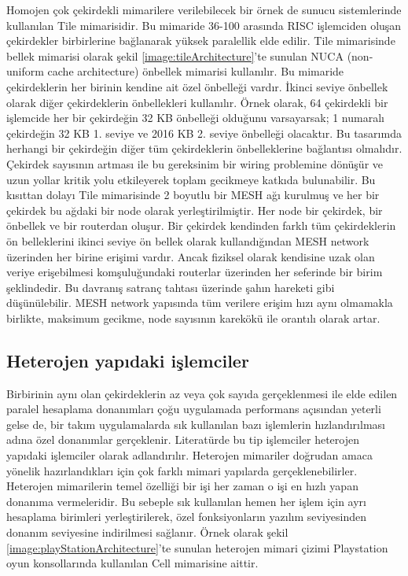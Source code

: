 Homojen çok çekirdekli mimarilere verilebilecek bir örnek de sunucu sistemlerinde kullanılan Tile mimarisidir. \cite{tileArchitecture} Bu mimaride 36-100 arasında RISC işlemciden oluşan çekirdekler birbirlerine bağlanarak yüksek paralellik elde edilir. Tile mimarisinde bellek mimarisi olarak şekil  \ref{image:tileArchitecture}'te sunulan NUCA (non-uniform cache architecture) önbellek mimarisi kullanılır. Bu mimaride çekirdeklerin her birinin kendine ait özel önbelleği vardır. İkinci seviye önbellek olarak diğer çekirdeklerin önbellekleri kullanılır. Örnek olarak, 64 çekirdekli bir işlemcide her bir çekirdeğin 32 KB önbelleği olduğunu varsayarsak; 1 numaralı çekirdeğin 32 KB 1. seviye ve 2016 KB 2. seviye önbelleği olacaktır. Bu tasarımda herhangi bir çekirdeğin diğer tüm çekirdeklerin önbelleklerine bağlantısı olmalıdır. Çekirdek sayısının artması ile bu gereksinim bir wiring problemine dönüşür ve uzun yollar kritik yolu etkileyerek toplam gecikmeye katkıda bulunabilir. Bu kısıttan dolayı Tile mimarisinde 2 boyutlu bir MESH ağı kurulmuş ve her bir çekirdek bu ağdaki bir node olarak yerleştirilmiştir. Her node bir çekirdek, bir önbellek ve bir routerdan oluşur. Bir çekirdek kendinden farklı tüm çekirdeklerin ön belleklerini ikinci seviye ön bellek olarak kullandığından MESH network üzerinden her birine erişimi vardır. Ancak fiziksel olarak kendisine uzak olan veriye erişebilmesi komşuluğundaki routerlar üzerinden her seferinde bir birim şeklindedir. Bu davranış satranç tahtası üzerinde şahın hareketi gibi düşünülebilir. MESH network yapısında tüm verilere erişim hızı aynı olmamakla birlikte, maksimum gecikme, node sayısının karekökü ile orantılı olarak artar. 


\subsection{Heterojen yapıdaki işlemciler}
Birbirinin aynı olan çekirdeklerin az veya çok sayıda gerçeklenmesi ile elde edilen paralel hesaplama donanımları çoğu uygulamada performans açısından yeterli gelse de, bir takım uygulamalarda sık kullanılan bazı işlemlerin hızlandırılması adına özel donanımlar gerçeklenir. Literatürde bu tip işlemciler heterojen yapıdaki işlemciler olarak adlandırılır. Heterojen mimariler doğrudan amaca yönelik hazırlandıkları için çok farklı mimari yapılarda gerçeklenebilirler. Heterojen mimarilerin temel özelliği bir işi her zaman o işi en hızlı yapan donanıma vermeleridir. Bu sebeple sık kullanılan hemen her işlem için ayrı hesaplama birimleri yerleştirilerek, özel fonksiyonların yazılım seviyesinden donanım seviyesine indirilmesi sağlanır. Örnek olarak şekil \ref{image:playStationArchitecture}'te sunulan heterojen mimari çizimi Playstation oyun konsollarında kullanılan Cell mimarisine aittir. 

